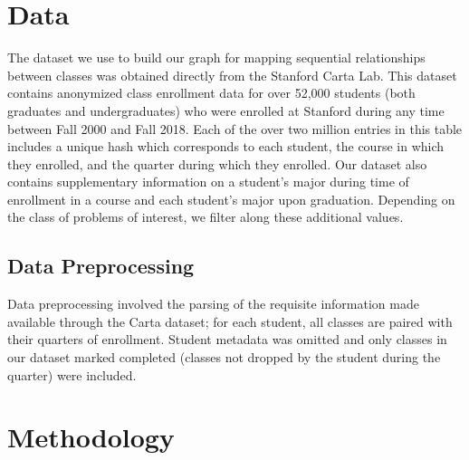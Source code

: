 \documentclass{sigchi}
\begin{document}
\section{Data}
The dataset we use to build our graph for mapping sequential relationships between classes was obtained directly from the Stanford Carta Lab. This dataset contains anonymized class enrollment data for over 52,000 students (both graduates and undergraduates) who were enrolled at Stanford during any time between Fall 2000 and Fall 2018. Each of the over two million entries in this table includes a unique hash which corresponds to each student, the course in which they enrolled, and the quarter during which they enrolled. Our dataset also contains supplementary information on a student's major during time of enrollment in a course and each student's major upon graduation. Depending on the class of problems of interest, we filter along these additional values.

\subsection{Data Preprocessing}

Data preprocessing involved the parsing of the requisite information made available through the Carta dataset; for each student, all classes are paired with their quarters of enrollment. Student metadata was omitted and only classes in our dataset marked completed (classes not dropped by the student during the quarter) were included.


\section{Methodology}
\end{document}

